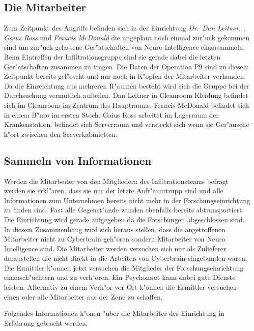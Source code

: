 \subsection{Die Mitarbeiter} 
Zum Zeitpunkt des Angriffs befinden sich in der Einrichtung \emph{Dr.~Dan Leitner}, \emph{\ml{}}, \emph{Gaius Ross} und \emph{Francis McDonald} die ungeplant noch einmal zur"uck gekommen sind um zur"uck gelassene Ger"atschaften von Neuro Intelligence einzusammeln. Beim Eintreffen der Infiltrationsgruppe sind sie gerade dabei die letzten Ger"atschaften zusammen zu tragen. Die Daten der Operation P9 sind zu diesem Zeitpunkt bereits gel"oscht und nur noch in K"opfen der Mitarbeiter vorhanden. Da die Einreichtung aus mehreren R"aumen besteht wird sich die Gruppe bei der Durchsuchung vermutlich aufteilen. Dan Leitner in Cleanroom Kleidung befindet sich im Cleanroom im Zentrum des Hauptraums. Francis McDonald befindet sich in einem B"uro im ersten Stoch. Gaius Ross arbeitet im Lagerraum der Krankenstation. \ml{} befindet sich Serverraum und versteckt sich wenn sie Ger"ausche h"ort zwischen den Serverkabinietten.

\subsection{Sammeln von Informationen} 
Werden die Mitarbeiter von den Mitgliedern des Infiltrationsteams befragt werden sie erkl"aren, dass 
sie nur der letzte Aufr"aumtrupp sind und alle Informationen zum Unternehmen bereits nicht mehr in der Forschungseinrichtung zu finden sind. Fast alle Gegenst"ande wurden ebenfalls bereits abtransportiert. Die Einrichtung wird gerade aufgegeben da die Forschungen abgeschlossen sind. In diesem Zusammenhang wird sich heraus stellen, dass die angetroffenen Mitarbeiter nicht zu Cyberbrain geh"oren sondern Mitarbeiter von Neuro Intelligence sind. Die Mitarbeiter werden versuchen sich nur als Zulieferer darzustellen die nicht direkt in die Arbeiten von Cyberbrain eingebunden waren. Die Ermittler k"onnen jetzt versuchen die Mitglieder der Forschungseinrichtung einzusch"uchtern und zu verh"oren. Ein Psychonaut kann dabei gute Dienste leisten. Alternativ zu einem Verh"or vor Ort k"onnen die Ermittler versuchen einen oder alle Mitarbeiter aus der Zone zu schaffen. 

Folgendes Informationen k"onen "uber die Mitarbeiter der Einrichtung in Erfahrung gebracht werden:

